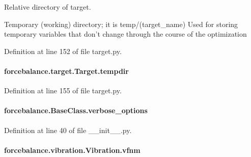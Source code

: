 Relative directory of target. 

Temporary (working) directory; it is temp/(target\-\_\-name) Used for storing temporary variables that don't change through the course of the optimization 

Definition at line 152 of file target.\-py.

\hypertarget{classforcebalance_1_1target_1_1Target_aa1f01b5b78db253b5b66384ed11ed193}{
\paragraph[{tempdir}]{\setlength{\rightskip}{0pt plus 5cm}forcebalance.\-target.\-Target.\-tempdir\hspace{0.3cm}{\ttfamily [inherited]}}}\label{classforcebalance_1_1target_1_1Target_aa1f01b5b78db253b5b66384ed11ed193}


Definition at line 155 of file target.\-py.

\hypertarget{classforcebalance_1_1BaseClass_afd68efa29ccd2f320f4cf82198214aac}{
\paragraph[{verbose\-\_\-options}]{\setlength{\rightskip}{0pt plus 5cm}forcebalance.\-Base\-Class.\-verbose\-\_\-options\hspace{0.3cm}{\ttfamily [inherited]}}}\label{classforcebalance_1_1BaseClass_afd68efa29ccd2f320f4cf82198214aac}


Definition at line 40 of file \-\_\-\-\_\-init\-\_\-\-\_\-.\-py.

\hypertarget{classforcebalance_1_1vibration_1_1Vibration_a50552dbdadc7a86aaab97bfdcf85e449}{
\paragraph[{vfnm}]{\setlength{\rightskip}{0pt plus 5cm}forcebalance.\-vibration.\-Vibration.\-vfnm}}\label{classforcebalance_1_1vibration_1_1Vibration_a50552dbdadc7a86aaab97bfdcf85e449}


